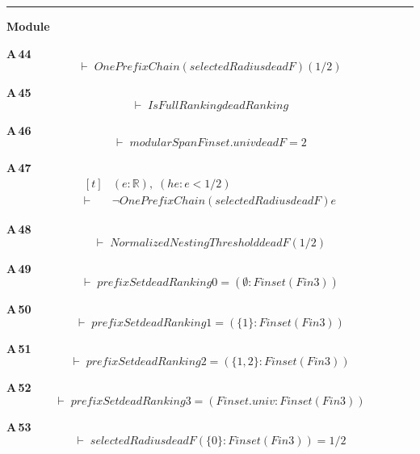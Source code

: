 \vspace{4pt}\noindent\rule{\columnwidth}{0.4pt}\par\vspace{2pt}
\noindent\textbf{Module }\par\vspace{3pt}

\noindent\textbf{A\,44}\quad{}
{\footnotesize\[ \vdash\; \mathit{OnePrefixChain} (\mathit{selectedRadius} \mathit{deadF}) (1 / 2) \]}

\noindent\textbf{A\,45}\quad{}
{\footnotesize\[ \vdash\; \mathit{IsFullRanking} \mathit{deadRanking} \]}

\noindent\textbf{A\,46}\quad{}
{\footnotesize\[ \vdash\; \mathit{modularSpan} \mathit{Finset}.\mathit{univ} \mathit{deadF} = 2 \]}

\noindent\textbf{A\,47}\quad{}
{\footnotesize\[ \begin{aligned}[t]
&(\mathit{e} : \mathbb{R} ),\; (\mathit{he} : \mathit{e} < 1 / 2)\\
\vdash\;&\neg \mathit{OnePrefixChain} (\mathit{selectedRadius} \mathit{deadF}) \mathit{e}
\end{aligned} \]}

\noindent\textbf{A\,48}\quad{}
{\footnotesize\[ \vdash\; \mathit{NormalizedNestingThreshold} \mathit{deadF} (1 / 2) \]}

\noindent\textbf{A\,49}\quad{}
{\footnotesize\[ \vdash\; \mathit{prefixSet} \mathit{deadRanking} 0 = (\emptyset : \mathit{Finset} (\mathit{Fin} 3)) \]}

\noindent\textbf{A\,50}\quad{}
{\footnotesize\[ \vdash\; \mathit{prefixSet} \mathit{deadRanking} 1 = (\{ 1\} : \mathit{Finset} (\mathit{Fin} 3)) \]}

\noindent\textbf{A\,51}\quad{}
{\footnotesize\[ \vdash\; \mathit{prefixSet} \mathit{deadRanking} 2 = (\{ 1,2\} : \mathit{Finset} (\mathit{Fin} 3)) \]}

\noindent\textbf{A\,52}\quad{}
{\footnotesize\[ \vdash\; \mathit{prefixSet} \mathit{deadRanking} 3 = (\mathit{Finset}.\mathit{univ} : \mathit{Finset} (\mathit{Fin} 3)) \]}

\noindent\textbf{A\,53}\quad{}
{\footnotesize\[ \vdash\; \mathit{selectedRadius} \mathit{deadF} (\{ 0\} : \mathit{Finset} (\mathit{Fin} 3)) = 1 / 2 \]}

